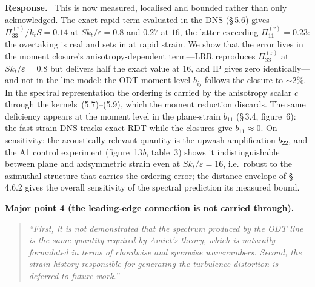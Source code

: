 \documentclass[11pt]{article}
\newenvironment{refcomment}%
  {\begin{quote}\color{commentgray}\itshape}%
  {\end{quote}}
\newcommand{\response}{\medskip\noindent\textbf{Response.}\ }
\newcommand{\point}[1]{\bigskip\noindent\textbf{#1}}
\begin{document}
\response
This is now measured, localised and bounded rather than only acknowledged.
The exact rapid term evaluated in the DNS (\S\,5.6) gives
$\Pi^{(\mathrm r)}_{33}/k_tS=0.14$ at $Sk_t/\varepsilon=0.8$ and $0.27$ at
$16$, the latter exceeding $\Pi^{(\mathrm r)}_{11}=0.23$: the overtaking is
real and sets in at rapid strain. We show that the error lives in the
moment closure's anisotropy-dependent term---LRR reproduces
$\Pi^{(\mathrm r)}_{33}$ at $Sk_t/\varepsilon=0.8$ but delivers half the
exact value at $16$, and IP gives zero identically---and not in the line
model: the ODT moment-level $b_{ij}$ follows the closure to $\sim 2\%$. In
the spectral representation the ordering is carried by the anisotropy
scalar $c$ through the kernels~(5.7)--(5.9), which the moment reduction
discards. The same deficiency appears at the moment level in the
plane-strain $b_{11}$ (\S\,3.4, figure~6): the fast-strain DNS tracks exact
RDT while the closures give $b_{11}\approx0$. On sensitivity: the
acoustically relevant quantity is the upwash amplification $b_{22}$, and
the A1 control experiment (figure~13\textit{b}, table~3) shows it
indistinguishable between plane and axisymmetric strain even at
$Sk_t/\varepsilon=16$, i.e.\ robust to the azimuthal structure that carries
the ordering error; the distance envelope of \S\,4.6.2 gives the overall
sensitivity of the spectral prediction its measured bound.

\point{Major point 4 (the leading-edge connection is not carried through).}
\begin{refcomment}
``First, it is not demonstrated that the spectrum produced by the ODT line
is the same quantity required by Amiet's theory, which is naturally
formulated in terms of chordwise and spanwise wavenumbers. Second, the
strain history responsible for generating the turbulence distortion is
deferred to future work.''
\end{refcomment}
\end{document}
